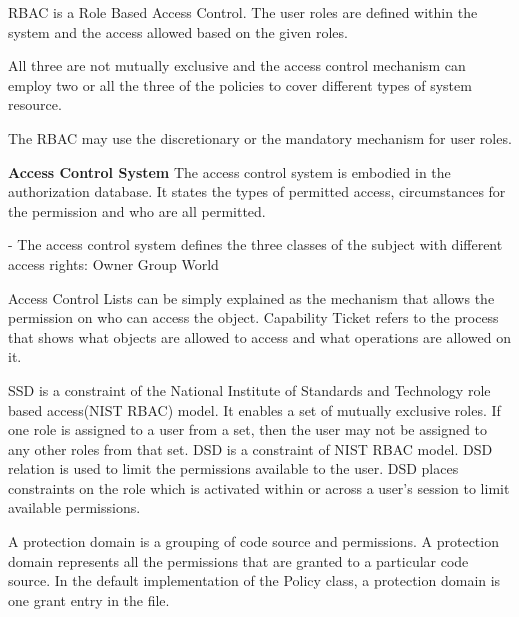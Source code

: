 \documentclass[../CIT288SecurityResearchNotebook.tex]{subfiles}
\begin{document}

RBAC is a Role Based Access Control. The user roles are defined 
within the system and the access allowed based on the given roles.


All three are not mutually exclusive and the access control mechanism
can employ two or all the three of the policies to cover different 
types of system resource.


The RBAC may use the discretionary or the 
mandatory mechanism for user roles.


{\bf{Access Control System}} The access control system is embodied in the authorization database. It states the types of permitted access, circumstances for the permission and who are all permitted. 
\linebreak[1]\vspace{0.5cm}

\begin{outline}\centering
- The access control system defines 
the three classes of the subject with different access rights:
	\1 Owner
	\1 Group
	\1 World
\end{outline}



Access Control Lists can be simply explained as the mechanism that allows the
permission on who  can access the object. Capability Ticket refers to the process that
shows what objects are allowed to access and what operations are allowed on it.


SSD is a constraint of the National Institute of Standards and Technology role based
access(NIST RBAC) model. It enables a set of mutually exclusive roles. If one role is
assigned to a user from a set, then the user may not be assigned to any other roles
from that set.
DSD is a constraint of NIST RBAC model. DSD relation is used to limit the permissions
available to the user. DSD places constraints on the role which is activated within or
across a user's session to limit available permissions.


A protection domain is a grouping of code source and permissions. A protection domain
represents all the permissions that are granted to a particular code source. In the
default implementation of the Policy class, a protection domain is one grant entry in
the file.
\end{document}
